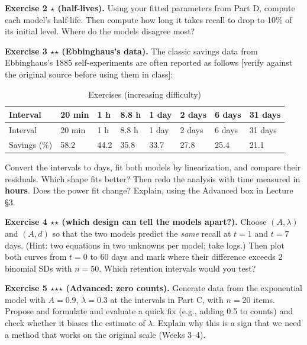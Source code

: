 \textbf{Exercise 2 \ensuremath{\star} (half-lives).} Using your fitted parameters from
Part D, compute each model's half-life. Then compute how long it takes
recall to drop to 10\% of its initial level. Where do the models
disagree most?

\textbf{Exercise 3 \ensuremath{\star}\ensuremath{\star} (Ebbinghaus's data).} The classic savings data
from Ebbinghaus's 1885 self-experiments are often reported as follows
{[}verify against the original source before using them in class{]}:

\begin{landscape}\small
\begin{longtable}[]{@{}llllllll@{}}
\caption{\centering Exercises (increasing difficulty)}\tabularnewline
\toprule\noalign{}
Interval & 20 min & 1 h & 8.8 h & 1 day & 2 days & 6 days & 31 days \\
\midrule\noalign{}
\endfirsthead
\toprule\noalign{}
Interval & 20 min & 1 h & 8.8 h & 1 day & 2 days & 6 days & 31 days \\
\midrule\noalign{}
\endhead
\bottomrule\noalign{}
\endlastfoot
Savings (\%) & 58.2 & 44.2 & 35.8 & 33.7 & 27.8 & 25.4 & 21.1 \\
\end{longtable}
\end{landscape}

Convert the intervals to days, fit both models by linearization, and
compare their residuals. Which shape fits better? Then redo the analysis
with time measured in \textbf{hours}. Does the power fit change?
Explain, using the Advanced box in Lecture §3.

\textbf{Exercise 4 \ensuremath{\star}\ensuremath{\star} (which design can tell the models apart?).} Choose
\((A, \lambda)\) and \((A, d)\) so that the two models predict the
\emph{same} recall at \(t = 1\) and \(t = 7\) days. (Hint: two equations
in two unknowns per model; take logs.) Then plot both curves from
\(t = 0\) to \(60\) days and mark where their difference exceeds 2
binomial SDs with \(n = 50\). Which retention intervals would you test?

\textbf{Exercise 5 \ensuremath{\star}\ensuremath{\star}\ensuremath{\star} (Advanced: zero counts).} Generate data from the
exponential model with \(A = 0.9\), \(\lambda = 0.3\) at the intervals
in Part C, with \(n = 20\) items. Propose and formulate and evaluate a quick fix
(e.g., adding 0.5 to counts) and check whether it biases the estimate of
\(\lambda\). Explain why this is a sign that we need a method that works
on the original scale (Weeks 3--4).

